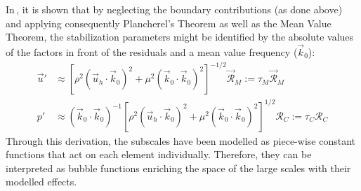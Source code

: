 In\,\cite{Codina2002}, it is shown that by neglecting the boundary contributions (as done above) and applying consequently Plancherel's Theorem as well as the Mean Value Theorem, the stabilization parameters might be identified by the absolute values of the factors in front of the residuals and a mean value frequency ($\vec{k}_0$):
\begin{equation*}
	\begin{split}
		\vec{u}' &\approx {\left[{{\rho^2(\vec{u}_{h}\cdot \vec{k}_0)^2 + \mu^2({\vec{k}}_0\cdot\vec{k}_0)^2}}\right]}^{-1/2}\vec{\mathcal{R}}_M := \tau_M\vec{\mathcal{R}}_M\\
		p' &\approx (\vec{k}_0\cdot\vec{k}_0)^{-1} {\left[{{\rho}^2(\vec{u}_{h}\cdot \vec{k}_0)^2 + \mu^2({\vec{k}}_0\cdot\vec{k}_0)^2}\right]}^{1/2}\mathcal{R}_C := \tau_C\mathcal{R}_C
	\end{split}
\end{equation*}
Through this derivation, the subscales have been modelled as piece-wise constant functions that act on each element individually. Therefore, they can be interpreted as bubble functions enriching the space of the large scales with their modelled effects.

